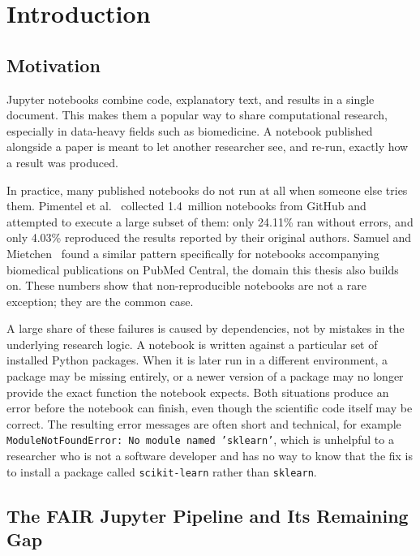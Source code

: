 \chapter{Introduction}
\label{chap:introduction}

\section{Motivation}
\label{sec:intro-motivation}

Jupyter notebooks combine code, explanatory text, and results in a single
document. This makes them a popular way to share computational research,
especially in data-heavy fields such as biomedicine. A notebook published
alongside a paper is meant to let another researcher see, and re-run, exactly
how a result was produced.

In practice, many published notebooks do not run at all when someone else
tries them. Pimentel et al.~\cite{pimentel2019msr} collected 1.4~million
notebooks from GitHub and attempted to execute a large subset of them: only
24.11\% ran without errors, and only 4.03\% reproduced the results reported by
their original authors. Samuel and Mietchen~\cite{samuel2024gigascience}
found a similar pattern specifically for notebooks accompanying biomedical
publications on PubMed Central, the domain this thesis also builds on. These
numbers show that non-reproducible notebooks are not a rare exception; they
are the common case.

A large share of these failures is caused by dependencies, not by mistakes in
the underlying research logic. A notebook is written against a particular set
of installed Python packages. When it is later run in a different
environment, a package may be missing entirely, or a newer version of a
package may no longer provide the exact function the notebook expects. Both
situations produce an error before the notebook can finish, even though the
scientific code itself may be correct. The resulting error messages are often
short and technical, for example \texttt{ModuleNotFoundError: No module named
'sklearn'}, which is unhelpful to a researcher who is not a software
developer and has no way to know that the fix is to install a package called
\texttt{scikit-learn} rather than \texttt{sklearn}.

\section{The FAIR Jupyter Pipeline and Its Remaining Gap}
\label{sec:intro-gap}

